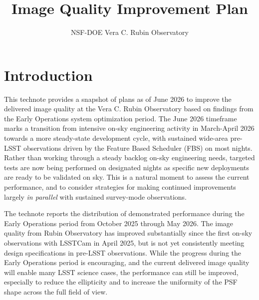 \documentclass[SO,lsst,authoryear,toc]{lsstdoc}
\title{Image Quality Improvement Plan}
\author{%
NSF-DOE Vera C. Rubin Observatory
}
\date{\vcsDate}
\begin{document}
\maketitle


\section{Introduction}

This technote provides a snapshot of plans as of June 2026 to improve the delivered image quality at the Vera C. Rubin Observatory based on findings from the Early Operations system optimization period.
The June 2026 timeframe marks a transition from intensive on-sky engineering activity in March-April 2026 towards a more steady-state development cycle, with sustained wide-area pre-LSST observations driven by the Feature Based Scheduler (FBS) on most nights.
Rather than working through a steady backlog on-sky engineering needs, targeted tests are now being performed on designated nights as specific new deployments are ready to be validated on sky.
This is a natural moment to assess the current performance, and to consider strategies for making continued improvements largely \emph{in parallel} with sustained survey-mode observations.

The technote \cite{RTN-122} reports the distribution of demonstrated performance during the Early Operations period from October 2025 through May 2026.
The image quality from Rubin Observatory has improved substantially since the first on-sky observations with LSSTCam in April 2025, but is not yet consistently meeting design specifications in pre-LSST observations.
While the progress during the Early Operations period is encouraging, and the current delivered image quality will enable many LSST science cases, the performance can still be improved, especially to reduce the ellipticity and to increase the uniformity of the PSF shape across the full field of view.
\end{document}
